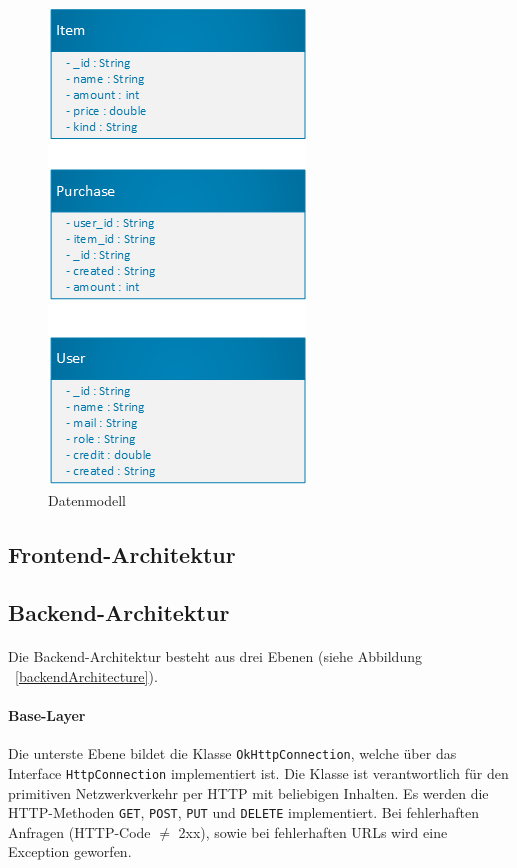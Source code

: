 \documentclass{scrartcl}
\begin{document}
			\begin{figure}[!h]
				\centering
				\includegraphics[scale=0.5]{./figures/datamodel.png}
				\caption{Datenmodell}
				\label{datamodel}
			\end{figure}
		
		\subsection{Frontend-Architektur} \label{architecture::frontend}
		
		\subsection{Backend-Architektur} \label{architecture::backend}
			\paragraph*{}
			Die Backend-Architektur besteht aus drei Ebenen (siehe Abbildung ~\ref{backendArchitecture}).
			
			\paragraph*{Base-Layer}
			Die unterste Ebene bildet die Klasse \texttt{OkHttpConnection}, welche über das Interface \texttt{HttpConnection} implementiert ist. Die Klasse ist verantwortlich für den primitiven Netzwerkverkehr per HTTP mit beliebigen Inhalten. Es werden die HTTP-Methoden \texttt{GET}, \texttt{POST}, \texttt{PUT} und \texttt{DELETE} implementiert. Bei fehlerhaften Anfragen (HTTP-Code $\neq$ 2xx), sowie bei fehlerhaften URLs wird eine Exception geworfen.
			
\end{document}
